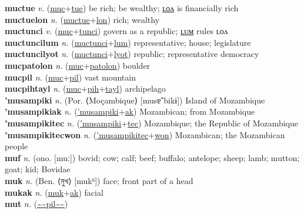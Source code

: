 \textbf{muctue} \textit{v.} (\hyperref[muc]{muc}+\hyperref[tue]{tue})
be rich; be wealthy; \hyperref[muctuelon]{ʟᴏᴧ} is financially rich \label{muctue} \\
\textbf{muctuelon} \textit{n.} (\hyperref[muctue]{muctue}+\hyperref[lon]{lon})
rich; wealthy \label{muctuelon} \\
\textbf{muctunci} \textit{v.} (\hyperref[muc]{muc}+\hyperref[tunci]{tunci})
govern as a republic; \hyperref[muctuncilum]{ʟᴜᴍ} rules ʟᴏᴧ \label{muctunci} \\
\textbf{muctuncilum} \textit{n.} (\hyperref[muctunci]{muctunci}+\hyperref[lum]{lum})
representative; house; legislature \label{muctuncilum} \\
\textbf{muctuncilyot} \textit{n.} (\hyperref[muctunci]{muctunci}+\hyperref[lyot]{lyot})
republic; representative democracy \label{muctuncilyot} \\
\textbf{mucpatolon} \textit{n.} (\hyperref[muc]{muc}+\hyperref[patolon]{patolon})
boulder \label{mucpatolon} \\
\textbf{mucpil} \textit{n.} (\hyperref[muc]{muc}+\hyperref[pil]{pil})
vast mountain \label{mucpil} \\
\textbf{mucpihtayl} \textit{n.} (\hyperref[muc]{muc}+\hyperref[pih]{pih}+\hyperref[tayl]{tayl})
archipelago \label{mucpihtayl} \\
\textbf{'musampiki} \textit{n.} (Por. ⟨Moçambique⟩ [musɐ̃ˈbikɨ])
Island of Mozambique \label{'musampiki} \\
\textbf{'musampikiak} \textit{n.} (\hyperref['musampiki]{'musampiki}+\hyperref[ak]{ak})
Mozambican; from Mozambique \label{'musampikiak} \\
\textbf{'musampikitec} \textit{n.} (\hyperref['musampiki]{'musampiki}+\hyperref[tec]{tec})
Mozambique; the Republic of Mozambique \label{'musampikitec} \\
\textbf{'musampikitecwon} \textit{n.} (\hyperref['musampikitec]{'musampikitec}+\hyperref[won]{won})
Mozambican; the Mozambican people \label{'musampikitecwon} \\
\textbf{muf} \textit{n.} (ono. [muː])
bovid; cow; calf; beef; buffalo; antelope; sheep; lamb; mutton; goat; kid; Bovidae \label{muf} \\
\textbf{muk} \textit{n.} (Ben. ⟨মুখ⟩ [mukʰ])
face; front part of a head \label{muk} \\
\textbf{mukak} \textit{n.} (\hyperref[muk]{muk}+\hyperref[ak]{ak})
facial \label{mukak} \\
\textbf{mut} \textit{n.} (\hyperref[pil]{\~{}\~{}pil\~{}\~{}})
